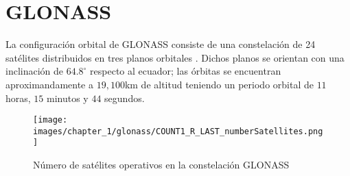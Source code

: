 \section{GLONASS}
\label{sec:glonass}

\begin{justify}
    La configuración orbital de GLONASS consiste de una constelación de 24 satélites distribuidos en tres planos orbitales \parencite{glonass_iac}.
    Dichos planos se orientan con una inclinación de $64.8^\circ$ respecto al ecuador; las órbitas se encuentran aproximandamente
    a $19,100$km de altitud teniendo un periodo orbital de $11$ horas, $15$ minutos y $44$ segundos.

    \begin{figure}[H]
        \centering
        \texttt{[image: images/chapter\_1/glonass/COUNT1\_R\_LAST\_numberSatellites.png]}
        \caption{Número de satélites operativos en la constelación GLONASS}
        \label{fig:glonass_numSatellites}
    \end{figure}
\end{justify}

